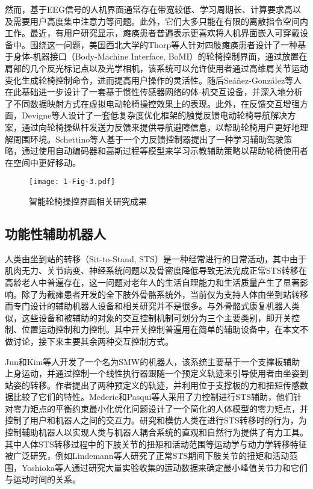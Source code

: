 然而，基于EEG信号的人机界面通常存在带宽较低、学习周期长、计算要求高以及需要用户高度集中注意力等问题。此外，它们大多只能在有限的离散指令空间内工作。最近，有用户研究显示，瘫痪患者普遍表示更喜欢将人机界面嵌入可穿戴设备中\cite{zhangUnderstandingInteractionsSmart2022}。围绕这一问题，美国西北大学的Thorp等人\cite{thorpUpperBodyBasedPower2016d}针对四肢瘫痪患者设计了一种基于身体-机器接口（Body-Machine Interface, BoMI）的轮椅控制界面，通过放置在肩部的几个反光标记点以及光学相机，该系统可以允许使用者通过高维肩关节运动变化生成轮椅控制命令，进而提高用户操作的灵活性。随后Seáñez-González等人\cite{seanez-gonzalezStaticDynamicDecoding2017}在此基础进一步设计了一套基于惯性传感器网络的体-机交互设备，并深入地分析了不同数据映射方式在虚拟电动轮椅操控效果上的表现。此外，在反馈交互增强方面，Devigne等人\cite{devigneDesignHapticGuidance2018}设计了一套低复杂度优化框架的触觉反馈电动轮椅导航解决方案，通过向轮椅操纵杆发送力反馈来提供导航避障信息，以帮助轮椅用户更好地理解周围环境。Schettino等人\cite{schettinoImprovingGeneralisationLearning2020}基于一个力反馈控制器提出了一种学习辅助驾驶策略，通过使用自动编码器和高斯过程等模型来学习示教辅助策略以帮助轮椅使用者在空间中更好移动。

\begin{figure}[h]
  \centering
  \texttt{[image: 1-Fig-3.pdf]}
  \caption{智能轮椅操控界面相关研究成果}
  \label{fig:1-3}
\end{figure}

\subsection{功能性辅助机器人}
人类由坐到站的转移（Sit-to-Stand, STS）是一种经常进行的日常活动，其中由于肌肉无力、关节病变、神经系统问题以及骨密度降低导致无法完成正常STS转移在高龄老人中普遍存在，这一问题对老年人的生活自理能力和生活质量产生了显著影响。除了为截瘫患者开发的全下肢外骨骼系统外，当前仅为支持人体由坐到站转移而专门设计的辅助机器人设备和相关研究并不是很多。与外骨骼式康复机器人类似，这些设备和被辅助的对象的交互控制机制可划分为三个主要类别，即开关控制、位置运动控制和力控制。其中开关控制普遍用在简单的辅助设备中，在本文不做讨论，接下来主要其余两种交互控制方式。

Jun和Kim等人\cite{hong-guljunWalkingSittostandSupport2011,inhokimKinematicAnalysisSittostand2011}开发了一个名为SMW的机器人，该系统主要基于一个支撑板辅助上身运动，并通过控制一个线性执行器跟随一个预定义轨迹来引导使用者由坐姿到站姿的转移。作者提出了两种预定义的轨迹，并利用位于支撑板的力和扭矩传感数据比较了它们的特性。Mederic和Pasqui等人\cite{medericElderlyPeopleSit2006}采用了力控制进行STS辅助，他们针对零力矩点的平衡约束最小化优化问题设计了一个简化的人体模型的零力矩点，并控制了用户和机器人之间的交互力。研究和模仿人类在进行STS转移时的行为，为控制辅助机器人以实现人类与机器人耦合系统的直观和自然行为提供了有力工具。其中人体STS转移过程中的下肢关节的扭矩和活动范围等运动学与动力学转移特征被广泛研究，例如Lindemann等人\cite{galliQuantitativeAnalysisSit2008}研究了正常STS期间下肢关节的扭矩和活动范围，Yoshioka等人\cite{yoshiokaBiomechanicalAnalysisRelation2009}通过研究大量实验收集的运动数据来确定最小峰值关节力和它们与运动时间的关系。

